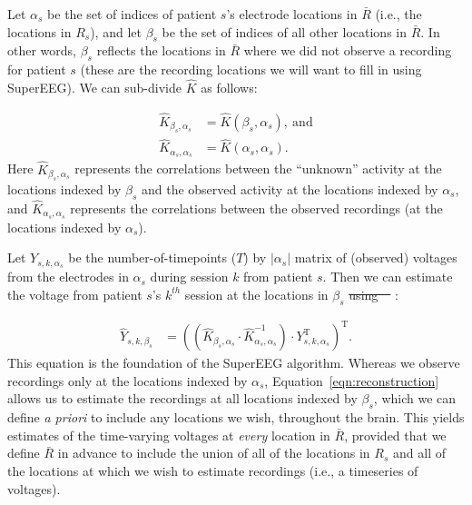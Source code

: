 \documentclass[11pt]{article}
\providecommand{\DIFaddtex}[1]{{\protect\color{blue}\uwave{#1}}} %
\providecommand{\DIFdeltex}[1]{{\protect\color{red}\sout{#1}}}                      %
\providecommand{\DIFaddbegin}{} %
\providecommand{\DIFaddend}{} %
\providecommand{\DIFdelbegin}{} %
\providecommand{\DIFdelend}{} %
\providecommand{\DIFadd}[1]{\texorpdfstring{\DIFaddtex{#1}}{#1}} %
\providecommand{\DIFdel}[1]{\texorpdfstring{\DIFdeltex{#1}}{}} %
\newcommand{\DIFscaledelfig}{0.5}
\newlength{\DIFdelgraphicswidth} %
\newlength{\DIFdelgraphicsheight} %
\newcommand{\DIFaddincludegraphics}[2][]{{\color{blue}\fbox{\DIFOincludegraphics[#1]{#2}}}} %
\newcommand{\DIFdelincludegraphics}[2][]{%
\sbox{\DIFdelgraphicsbox}{\DIFOincludegraphics[#1]{#2}}%
\settoboxwidth{\DIFdelgraphicswidth}{\DIFdelgraphicsbox} %
\settoboxtotalheight{\DIFdelgraphicsheight}{\DIFdelgraphicsbox} %
\scalebox{\DIFscaledelfig}{%
\parbox[b]{\DIFdelgraphicswidth}{\usebox{\DIFdelgraphicsbox}\\[-\baselineskip] \rule{\DIFdelgraphicswidth}{0em}}\llap{\resizebox{\DIFdelgraphicswidth}{\DIFdelgraphicsheight}{%
\setlength{\unitlength}{\DIFdelgraphicswidth}%
\begin{picture}(1,1)%
\thicklines\linethickness{2pt} %
{\color[rgb]{1,0,0}\put(0,0){\framebox(1,1){}}}%
{\color[rgb]{1,0,0}\put(0,0){\line( 1,1){1}}}%
{\color[rgb]{1,0,0}\put(0,1){\line(1,-1){1}}}%
\end{picture}%
}\hspace*{3pt}}} %
} %
\DeclareRobustCommand{\DIFaddbegin}{\DIFOaddbegin \let\includegraphics\DIFaddincludegraphics} %
\DeclareRobustCommand{\DIFaddend}{\DIFOaddend \let\includegraphics\DIFOincludegraphics} %
\DeclareRobustCommand{\DIFdelbegin}{\DIFOdelbegin \let\includegraphics\DIFdelincludegraphics} %
\DeclareRobustCommand{\DIFdelend}{\DIFOaddend \let\includegraphics\DIFOincludegraphics} %
\begin{document}
Let $\alpha_s$ be the set of indices of patient $s$'s electrode locations in
\DIFdelbegin \DIFdel{$\bar{R}$ }\DIFdelend \DIFaddbegin \DIFadd{$\overline{R}$ }\DIFaddend (i.e., the locations in $R_s$), and let $\beta_s$ be the set of
indices of all other locations in \DIFdelbegin \DIFdel{$\bar{R}$}\DIFdelend \DIFaddbegin \DIFadd{$\overline{R}$}\DIFaddend . In other words, $\beta_s$ reflects
the locations in \DIFdelbegin \DIFdel{$\bar{R}$ }\DIFdelend \DIFaddbegin \DIFadd{$\overline{R}$ }\DIFaddend where we did not observe a recording for patient $s$
(these are the recording locations we will want to fill in using SuperEEG). We
can sub-divide $\hat{K}$ as follows:

\begin{align}
\hat{K}_{\beta_s,\alpha_s} &= \hat{K}(\beta_s,\alpha_s),~\mathrm{and}\label{eqn:Kba}\\
\hat{K}_{\alpha_s,\alpha_s} &= \hat{K}(\alpha_s,\alpha_s)\label{eqn:Kaa}.
\end{align}
Here $\hat{K}_{\beta_s, \alpha_s}$ represents the correlations between
the ``unknown'' activity at the locations indexed by $\beta_s$ and the
observed activity at the locations indexed by $\alpha_s$, and
$\hat{K}_{\alpha_s, \alpha_s}$ represents the correlations between the
observed recordings (at the locations indexed by $\alpha_s$).

Let $Y_{s,k,\alpha_s}$ be the number-of-timepoints ($T$) by
$\left|\alpha_s\right|$ matrix of (observed) voltages from the electrodes in
$\alpha_s$ during session $k$ from patient $s$. Then we can estimate the voltage
from patient $s$'s $k^{th}$ session at the locations in $\beta_s$ \DIFdelbegin \DIFdel{using~\mbox{%
\cite{Rasm06}}\hspace{0pt}%
}\DIFdelend \DIFaddbegin \DIFadd{as
follows~\mbox{%
\citep{Rasm06}}\hspace{0pt}%
}\DIFaddend :

\begin{align}
\hat{Y}_{s,k,\beta_s} &= ((\hat{K}_{\beta_s,\alpha_s}\cdot\hat{K}_{\alpha_s,\alpha_s}^{-1})\cdot Y_{s,k,\alpha_s}^\mathrm{T})^\mathrm{T}.\label{eqn:reconstruction}
\end{align}
This equation is the foundation of the SuperEEG algorithm.  Whereas we
observe recordings only at the locations indexed by $\alpha_s$,
Equation~\ref{eqn:reconstruction} allows us to estimate the recordings
at all locations indexed by $\beta_s$, which we can define \textit{a priori}
to include any locations we wish, throughout the brain.  This yields
estimates of the time-varying voltages at \textit{every} location in
\DIFdelbegin \DIFdel{$\bar{R}$}\DIFdelend \DIFaddbegin \DIFadd{$\overline{R}$}\DIFaddend , provided that we define \DIFdelbegin \DIFdel{$\bar{R}$ }\DIFdelend \DIFaddbegin \DIFadd{$\overline{R}$ }\DIFaddend in advance to include the
union of all of the locations in $R_s$ and all of the locations
at which we wish to estimate recordings (i.e., a timeseries of
voltages).
\end{document}
